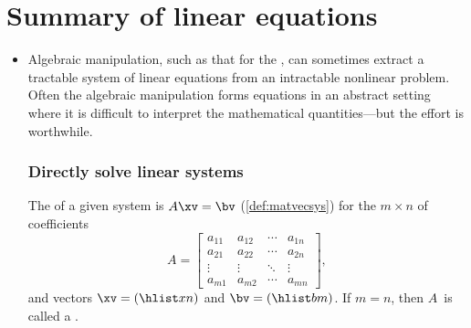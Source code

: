 
\section{Summary of linear equations}
\label{sec:sumle}

\begin{itemize}
\def\index#1{}%

\subsubsection{Introduction to systems of linear equations}


\itemhi A  in the \(n\)~variables \(x_1,x_2,\ldots,x_n\) is an equation that can be written in the form (\cref{def:lineqn})
\begin{equation*}
\lincomb axn=b\,.
\end{equation*}
A  of linear equations is a set of one or more linear equations in one or more variables.


\item Algebraic manipulation, such as that for the \gps, can sometimes extract a tractable system of linear equations from an intractable nonlinear problem.
Often the algebraic manipulation forms equations in an abstract setting where it is difficult to interpret the mathematical quantities---but the effort is worthwhile.



\subsubsection{Directly solve linear systems}

\itemme The  of a given system is \(A\xv=\bv\) (\cref{def:matvecsys}) for the \(m\times n\)  of coefficients
\begin{equation*}
A=\begin{bmatrix} a_{11}&a_{12}&\cdots&a_{1n}
\\a_{21}&a_{22}&\cdots&a_{2n}
\\\vdots&\vdots&\ddots&\vdots
\\a_{m1}&a_{m2}&\cdots&a_{mn} \end{bmatrix},
\end{equation*}
and vectors \(\xv=(\hlist xn)\) and \(\bv=(\hlist bm)\).
If \(m=n\), then \(A\)~is called a .


\end{itemize}

